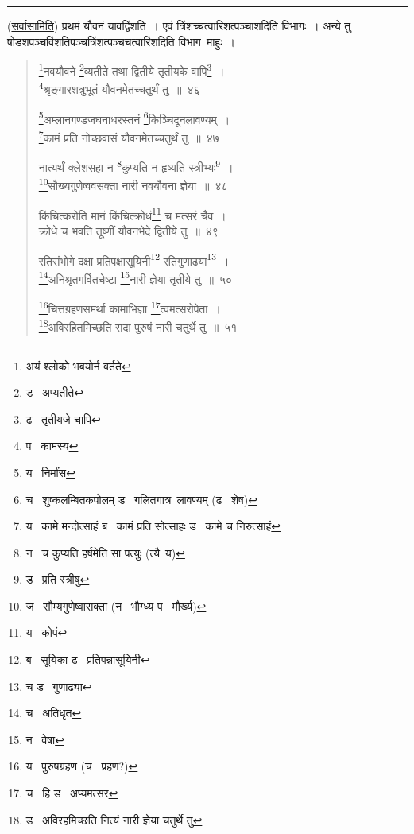 \documentclass[11pt, openany]{book}
\begin{document}
\hrule

\vspace{2mm}
(\underline{सर्वासामिति}) प्रथमं यौवनं यावद्विंशति~। एवं त्रिंशच्चत्वारिंशत्पञ्चाशदिति विभागः~। अन्ये तु षोडशपञ्चविंशतिपञ्चत्रिंशत्पञ्चचत्वारिंशदिति विभाग\textendash\ माहुः~।

\newpage

\begin{quote}
{\na \renewcommand{\thefootnote}{1}\footnote{अयं श्लोको भबयोर्न वर्तते}नवयौवने \renewcommand{\thefootnote}{2}\footnote{ड \textendash\  अप्यतीते}व्यतीते तथा द्वितीये तृतीयके वापि\renewcommand{\thefootnote}{3}\footnote{ढ \textendash\  तृतीयजे चापि}~।\\
\renewcommand{\thefootnote}{4}\footnote{प \textendash\  कामस्य}श्रृङ्गारशत्रुभूतं यौवनमेतच्चतुर्थं तु~॥~४६

\renewcommand{\thefootnote}{5}\footnote{य \textendash\  निर्मांस}अम्लानगण्डजघनाधरस्तनं \renewcommand{\thefootnote}{6}\footnote{च \textendash\  शुष्कलम्बितकपोलम् ड \textendash\  गलितगात्र\textendash\ लावण्यम् (ढ \textendash\  शेष)}किञ्चिदूनलावण्यम्~।\\
\renewcommand{\thefootnote}{7}\footnote{य \textendash\  कामे मन्दोत्साहं ब \textendash\  कामं प्रति सोत्साहः ड \textendash\  कामे च निरुत्साहं}कामं प्रति नोच्छवासं यौवनमेतच्चतुर्थं तु~॥~४७

नात्यर्थं क्लेशसहा न \renewcommand{\thefootnote}{8}\footnote{न \textendash\  च कुप्यति हर्षमेति सा पत्युः (त्यै\textendash\ य)}कुप्यति न हृष्यति स्त्रीभ्यः\renewcommand{\thefootnote}{9}\footnote{ड \textendash\  प्रति स्त्रीषु}~।\\
\renewcommand{\thefootnote}{10}\footnote{ज \textendash\  सौम्यगुणेष्वासक्ता (न \textendash\  भौग्ध्य प \textendash\  मौर्ख्य)}सौख्यगुणेष्ववसक्ता नारी नवयौवना ज्ञेया~॥~४८

किंचित्करोति मानं किंचित्क्रोधं\renewcommand{\thefootnote}{11}\footnote{य \textendash\  कोपं} च मत्सरं चैव~।\\
क्रोधे च भवति तूष्णीं यौवनभेदे द्वितीये तु~॥~४९

रतिसंभोगे दक्षा प्रतिपक्षासूयिनी\renewcommand{\thefootnote}{12}\footnote{ब \textendash\  सूयिका ढ \textendash\  प्रतिपन्नासूयिनी} रतिगुणाढया\renewcommand{\thefootnote}{13}\footnote{च ड \textendash\  गुणाढ्या}~।\\
\renewcommand{\thefootnote}{14}\footnote{च \textendash\  अतिधृत}अनिश्रृतगर्वितचेष्टा \renewcommand{\thefootnote}{15}\footnote{न \textendash\  वेषा}नारी ज्ञेया तृतीये तु~॥~५०

\renewcommand{\thefootnote}{16}\footnote{य \textendash\  पुरुषग्रहण (च \textendash\  प्रहण?)}चित्तग्रहणसमर्था कामाभिज्ञा \renewcommand{\thefootnote}{17}\footnote{च \textendash\  हि ड \textendash\  अप्यमत्सर}त्वमत्सरोपेता~।\\
\renewcommand{\thefootnote}{18}\footnote{ड \textendash\  अविरहमिच्छति नित्यं नारी ज्ञेया चतुर्थे तु}अविरहितमिच्छति सदा पुरुषं नारी चतुर्थे तु~॥~५१}
\end{quote}
\end{document}

